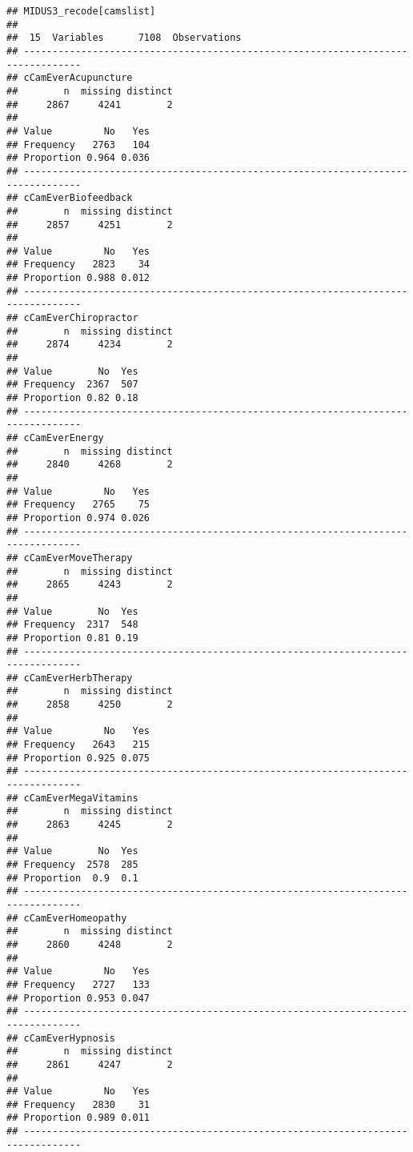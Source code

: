 \documentclass[
]{article}
\begin{document}
\begin{verbatim}
## MIDUS3_recode[camslist] 
## 
##  15  Variables      7108  Observations
## --------------------------------------------------------------------------------
## cCamEverAcupuncture 
##        n  missing distinct 
##     2867     4241        2 
##                       
## Value         No   Yes
## Frequency   2763   104
## Proportion 0.964 0.036
## --------------------------------------------------------------------------------
## cCamEverBiofeedback 
##        n  missing distinct 
##     2857     4251        2 
##                       
## Value         No   Yes
## Frequency   2823    34
## Proportion 0.988 0.012
## --------------------------------------------------------------------------------
## cCamEverChiropractor 
##        n  missing distinct 
##     2874     4234        2 
##                     
## Value        No  Yes
## Frequency  2367  507
## Proportion 0.82 0.18
## --------------------------------------------------------------------------------
## cCamEverEnergy 
##        n  missing distinct 
##     2840     4268        2 
##                       
## Value         No   Yes
## Frequency   2765    75
## Proportion 0.974 0.026
## --------------------------------------------------------------------------------
## cCamEverMoveTherapy 
##        n  missing distinct 
##     2865     4243        2 
##                     
## Value        No  Yes
## Frequency  2317  548
## Proportion 0.81 0.19
## --------------------------------------------------------------------------------
## cCamEverHerbTherapy 
##        n  missing distinct 
##     2858     4250        2 
##                       
## Value         No   Yes
## Frequency   2643   215
## Proportion 0.925 0.075
## --------------------------------------------------------------------------------
## cCamEverMegaVitamins 
##        n  missing distinct 
##     2863     4245        2 
##                     
## Value        No  Yes
## Frequency  2578  285
## Proportion  0.9  0.1
## --------------------------------------------------------------------------------
## cCamEverHomeopathy 
##        n  missing distinct 
##     2860     4248        2 
##                       
## Value         No   Yes
## Frequency   2727   133
## Proportion 0.953 0.047
## --------------------------------------------------------------------------------
## cCamEverHypnosis 
##        n  missing distinct 
##     2861     4247        2 
##                       
## Value         No   Yes
## Frequency   2830    31
## Proportion 0.989 0.011
## --------------------------------------------------------------------------------

\end{verbatim}
\end{document}
